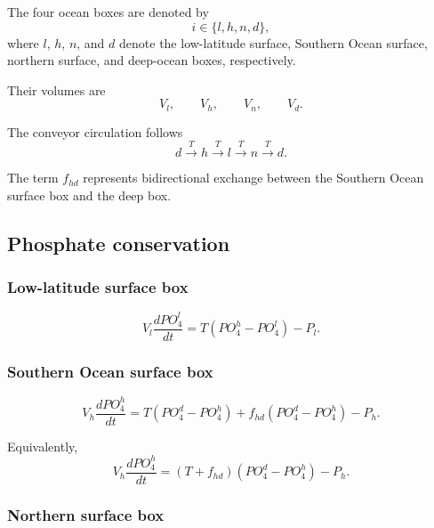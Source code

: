 \documentclass[11pt]{article}
\begin{document}
The four ocean boxes are denoted by
\[
i\in\{l,h,n,d\},
\]
where \(l\), \(h\), \(n\), and \(d\) denote the low-latitude
surface, Southern Ocean surface, northern surface, and
deep-ocean boxes, respectively.

Their volumes are
\[
V_l,\qquad V_h,\qquad V_n,\qquad V_d.
\]

The conveyor circulation follows
\begin{equation}
d
\xrightarrow{T}
h
\xrightarrow{T}
l
\xrightarrow{T}
n
\xrightarrow{T}
d.
\label{eq:four_box_conveyor}
\end{equation}

The term \(f_{hd}\) represents bidirectional exchange between
the Southern Ocean surface box and the deep box.

\subsection{Phosphate conservation}

\subsubsection{Low-latitude surface box}

\begin{equation}
V_l\frac{dPO_4^l}{dt}
=
T\left(PO_4^h-PO_4^l\right)
-
P_l.
\label{eq:four_po4_l}
\end{equation}

\subsubsection{Southern Ocean surface box}

\begin{equation}
V_h\frac{dPO_4^h}{dt}
=
T\left(PO_4^d-PO_4^h\right)
+
f_{hd}\left(PO_4^d-PO_4^h\right)
-
P_h.
\label{eq:four_po4_h}
\end{equation}

Equivalently,
\begin{equation}
V_h\frac{dPO_4^h}{dt}
=
\left(T+f_{hd}\right)
\left(PO_4^d-PO_4^h\right)
-
P_h.
\end{equation}

\subsubsection{Northern surface box}
\end{document}
